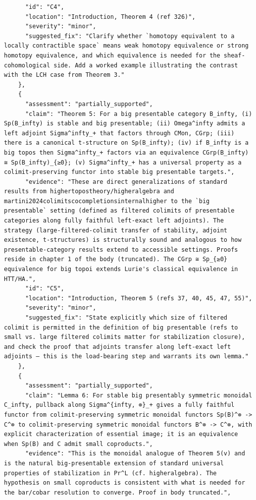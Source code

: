 \documentclass[11pt]{article}
\begin{document}
\begin{verbatim}
      "id": "C4",
      "location": "Introduction, Theorem 4 (ref 326)",
      "severity": "minor",
      "suggested_fix": "Clarify whether `homotopy equivalent to a locally contractible space` means weak homotopy equivalence or strong homotopy equivalence, and which equivalence is needed for the sheaf-cohomological side. Add a worked example illustrating the contrast with the LCH case from Theorem 3."
    },
    {
      "assessment": "partially_supported",
      "claim": "Theorem 5: For a big presentable category B_infty, (i) Sp(B_infty) is stable and big presentable; (ii) Omega^infty admits a left adjoint Sigma^infty_+ that factors through CMon, CGrp; (iii) there is a canonical t-structure on Sp(B_infty); (iv) if B_infty is a big topos then Sigma^infty_+ factors via an equivalence CGrp(B_infty) ≅ Sp(B_infty)_{≥0}; (v) Sigma^infty_+ has a universal property as a colimit-preserving functor into stable big presentable targets.",
      "evidence": "These are direct generalizations of standard results from highertopostheory/higheralgebra and martini2024colimitscocompletionsinternalhigher to the `big presentable` setting (defined as filtered colimits of presentable categories along fully faithful left-exact left adjoints). The strategy (large-filtered-colimit transfer of stability, adjoint existence, t-structures) is structurally sound and analogous to how presentable-category results extend to accessible settings. Proofs reside in chapter 1 of the body (truncated). The CGrp ≅ Sp_{≥0} equivalence for big topoi extends Lurie's classical equivalence in HTT/HA.",
      "id": "C5",
      "location": "Introduction, Theorem 5 (refs 37, 40, 45, 47, 55)",
      "severity": "minor",
      "suggested_fix": "State explicitly which size of filtered colimit is permitted in the definition of big presentable (refs to small vs. large filtered colimits matter for stabilization closure), and check the proof that adjoints transfer along left-exact left adjoints — this is the load-bearing step and warrants its own lemma."
    },
    {
      "assessment": "partially_supported",
      "claim": "Lemma 6: For stable big presentably symmetric monoidal C_infty, pullback along Sigma^{infty, ⊗}_+ gives a fully faithful functor from colimit-preserving symmetric monoidal functors Sp(B)^⊗ -> C^⊗ to colimit-preserving symmetric monoidal functors B^⊗ -> C^⊗, with explicit characterization of essential image; it is an equivalence when Sp(B) and C admit small coproducts.",
      "evidence": "This is the monoidal analogue of Theorem 5(v) and is the natural big-presentable extension of standard universal properties of stabilization in Pr^L (cf. higheralgebra). The hypothesis on small coproducts is consistent with what is needed for the bar/cobar resolution to converge. Proof in body truncated.",

\end{verbatim}
\end{document}
